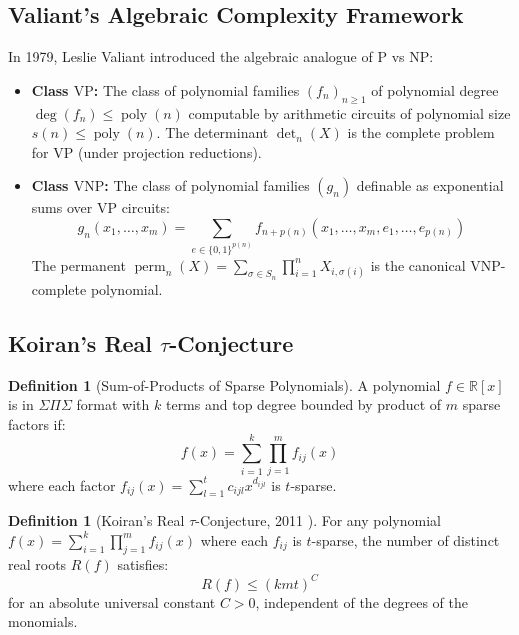 \documentclass[11pt,a4paper]{article}
\theoremstyle{definition}
\newtheorem{definition}[theorem]{Definition}
\begin{document}
\subsection{Valiant's Algebraic Complexity Framework}

In 1979, Leslie Valiant \cite{valiant1979} introduced the algebraic analogue of $\text{P}$ vs $\text{NP}$:
\begin{itemize}
    \item \textbf{Class $\mathrm{VP}$:} The class of polynomial families $(f_n)_{n \ge 1}$ of polynomial degree $\deg(f_n) \le \operatorname{poly}(n)$ computable by arithmetic circuits of polynomial size $s(n) \le \operatorname{poly}(n)$. The determinant $\det_n(X)$ is the complete problem for $\mathrm{VP}$ (under projection reductions).
    \item \textbf{Class $\mathrm{VNP}$:} The class of polynomial families $(g_n)$ definable as exponential sums over $\mathrm{VP}$ circuits:
    \[ g_n(x_1, \dots, x_m) = \sum_{e \in \{0, 1\}^{p(n)}} f_{n+p(n)}(x_1, \dots, x_m, e_1, \dots, e_{p(n)}) \]
    The permanent $\operatorname{perm}_n(X) = \sum_{\sigma \in S_n} \prod_{i=1}^n X_{i, \sigma(i)}$ is the canonical $\mathrm{VNP}$-complete polynomial.
\end{itemize}

\subsection{Koiran's Real $\tau$-Conjecture}

\begin{definition}[Sum-of-Products of Sparse Polynomials]\label{def:sum_prod_sparse}
A polynomial $f \in \mathbb{R}[x]$ is in $\Sigma \Pi \Sigma$ format with $k$ terms and top degree bounded by product of $m$ sparse factors if:
\begin{equation}\label{eq:koiran_form}
f(x) = \sum_{i=1}^k \prod_{j=1}^m f_{ij}(x)
\end{equation}
where each factor $f_{ij}(x) = \sum_{l=1}^t c_{ijl} x^{d_{ijl}}$ is $t$-sparse.
\end{definition}

\begin{definition}[Koiran's Real $\tau$-Conjecture, 2011 \cite{koiran2011}]\label{def:koiran_tau}
For any polynomial $f(x) = \sum_{i=1}^k \prod_{j=1}^m f_{ij}(x)$ where each $f_{ij}$ is $t$-sparse, the number of distinct real roots $R(f)$ satisfies:
\begin{equation}\label{eq:koiran_bound}
R(f) \le (k m t)^C
\end{equation}
for an absolute universal constant $C > 0$, independent of the degrees of the monomials.
\end{definition}
\end{document}
